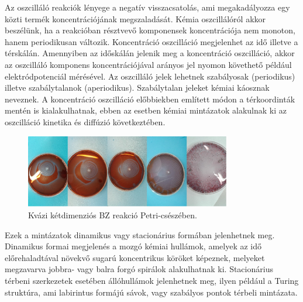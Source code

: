Az oszcilláló reakciók lényege a negatív visszacsatolás, ami megakadályozza egy közti termék koncentrációjának megszaladását.
Kémia oszcillálóról akkor beszélünk, ha a reakcióban résztvevő komponensek koncentrációja nem monoton, hanem periodikusan változik. Koncentráció oszcilláció megjelenhet az idő illetve a térskálán. Amennyiben az időskálán jelenik meg a koncentráció oszcilláció, akkor az oszcilláló komponens koncentrációjával arányos jel nyomon követhető például elektródpotenciál mérésével.
Az oszcilláló jelek lehetnek szabályosak (periodikus) illetve szabálytalanok (aperiodikus). Szabálytalan jeleket kémiai káosznak neveznek. A koncentráció oszcilláció előbbiekben említett módon a térkoordinták mentén is kialakulhatnak, ebben az esetben kémiai mintázatok alakulnak ki az oszcilláció kinetika és diffúzió következtében.


\begin{figure}
\centering
\includegraphics[width=0.8\textwidth]{img/oscillating_reaction.jpg}
\caption{Kvázi kétdimenziós BZ reakció Petri-csészében.}
\label{fig:ionophores}
\end{figure}

Ezek a mintázatok dinamikus vagy stacionárius formában jelenhetnek meg.
Dinamikus formai megjelenés a mozgó kémiai hullámok, amelyek az idő előrehaladtával növekvő sugarú koncentrikus köröket képeznek, melyeket megzavarva jobbra- vagy balra forgó spirálok alakulhatnak ki.
Stacionárius térbeni szerkezetek esetében állóhullámok jelenhetnek meg, ilyen például a Turing struktúra, ami labirintus formájú sávok, vagy szabályos pontok térbeli mintázata.

